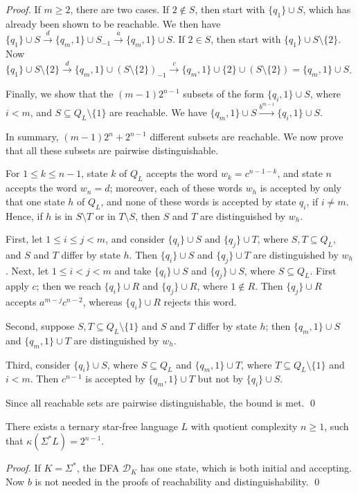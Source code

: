 \documentclass{llncs}
\renewcommand{\le}{\leqslant}
\renewcommand{\ge}{\geqslant}
\newcommand{\Sig}{\Sigma}
\newcommand{\cD}{{\mathcal D}}
\begin{document}
\begin{proof}
If $m\ge 2$, there are two cases. If $2\not\in S$, then start with $\{q_1\}\cup S$, which has already been shown to be reachable. We then have
$\{q_1\}\cup S \stackrel{d}{\longrightarrow} 
\{q_m,1\} \cup S_{-1} \stackrel{a}{\longrightarrow} 
\{q_m,1\} \cup S.
$
If $2\in S$, then start with $\{q_1\}\cup S\setminus\{2\}$.
Now
$\{q_1\}\cup S\setminus\{2\} \stackrel{d}{\longrightarrow} 
\{q_m,1\}\cup (S\setminus\{2\})_{-1} \stackrel{c}{\longrightarrow}
\{q_m,1\}\cup \{2\} \cup (S\setminus\{2\}) 
=\{q_m,1\}\cup S$.

Finally, we show that the $(m-1)2^{n-1}$ subsets of the form 
$ \{q_i,1\}  \cup S$, 
where $i<m$, and $S\subseteq Q_L\setminus \{1\}$ are reachable. We have
$\{q_m,1\} \cup S 
\stackrel{b^{m-i}}{\longrightarrow} 
\{q_i,1\} \cup S$.

In summary, $(m-1)2^n+2^{n-1}$ different subsets are reachable.
We now prove that all these subsets are pairwise distinguishable.

For $1\le k\le n-1$, state $k$ of $Q_L$ accepts the word $w_k=c^{n-1-k}$, and state $n$ accepts the word $w_n=d$; moreover,  each of these words $w_h$ is accepted by only that one state $h$ of $Q_L$, and none of these words is accepted by state $q_i$, if $i\neq m$.
Hence, if $h$ is in $S\setminus T$ or in $T\setminus S$, then 
 $S$ and $T$  are distinguished by $w_h$.


First, let $1\le i \le j < m$, and consider $\{q_i\}\cup S$ and $\{q_j\}\cup T$, where  $S,T\subseteq Q_L$,  and $S$ and $T$ differ by state $h$.
Then $\{q_i\}\cup S$ and $\{q_j\}\cup T$ are distinguished by $w_h$.
Next, let $1\le i < j < m$ and  take $\{q_i\}\cup S$ and $\{q_j\}\cup S$, where  $S \subseteq Q_L$.
First apply $c$; then we reach $\{q_i\}\cup R$ and $\{q_j\}\cup R$, where
$1\not\in R$.
Then $\{q_j\}\cup R$ accepts $a^{m-j}c^{n-2}$, whereas $\{q_i\}\cup R$ rejects this word.


Second, suppose $S,T\subseteq Q_L\setminus \{1\}$ and  $S$ and $T$ differ by state $h$; then $\{q_m,1\}\cup S$ and $\{q_m,1\}\cup T$ are distinguished by $w_h$.

Third, consider $\{q_i\}\cup S$, where $S\subseteq Q_L$ and $\{q_m,1\}\cup T$, where $T\subseteq Q_L\setminus \{1\}$ and  $i<m$. 
Then  $c^{n-1}$ is accepted by $\{q_m,1\}\cup T$ but not by $ \{q_i\}\cup S$. 

Since all reachable sets are pairwise distinguishable,   the bound is met.
\qed
\end{proof}

\begin{corollary}
\label{cor:prod}
There exists a ternary star-free language $L$ with quotient complexity  $n\ge 1$, such that  $\kappa(\Sig^*L)=2^{n-1}$.
\end{corollary}
\begin{proof}
If $K=\Sig^*$,  the DFA $\cD_K$ has one  state, which is both initial and accepting.
Now  $b$ is not needed in the proofs of reachability and
distinguishability.
\qed
\end{proof}
\end{document}
